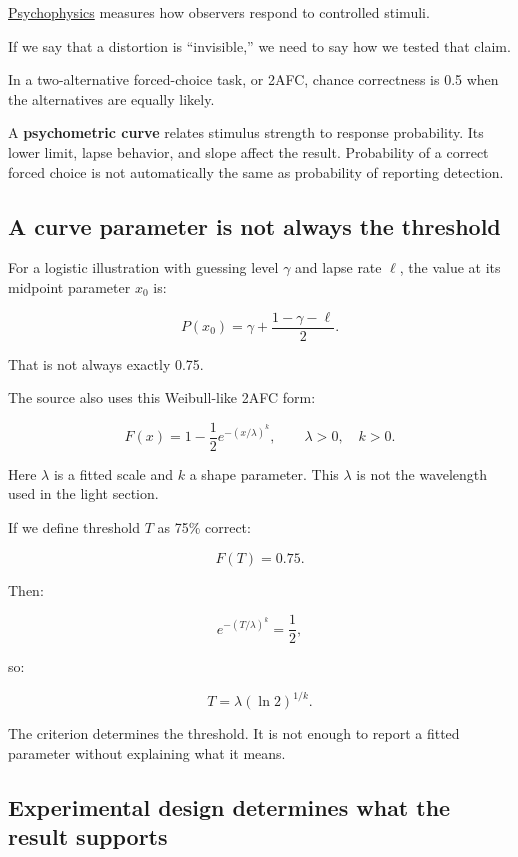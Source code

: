 \hyperref[appendix-1759f03e8ce7]{Psychophysics} measures how observers respond to controlled stimuli.

If we say that a distortion is ``invisible,'' we need to say how we tested that claim.

In a two-alternative forced-choice task, or 2AFC, chance correctness is 0.5 when the alternatives are equally likely.

A \textbf{psychometric curve} relates stimulus strength to response probability. Its lower limit, lapse behavior, and slope affect the result. Probability of a correct forced choice is not automatically the same as probability of reporting detection.

\subsection{A curve parameter is not always the threshold}\label{04-visual-computing-ii-ch043-a-curve-parameter-is-not-always-the-threshold}

For a logistic illustration with guessing level \(\gamma\) and lapse rate \(\ell\), the value at its midpoint parameter \(x_0\) is:

\[
P(x_0)=\gamma+\frac{1-\gamma-\ell}{2}.
\]

That is not always exactly 0.75.

The source also uses this Weibull-like 2AFC form:

\[
F(x)=1-\frac12e^{-(x/\lambda)^k},
\qquad \lambda>0,\quad k>0.
\]

Here \(\lambda\) is a fitted scale and \(k\) a shape parameter. This \(\lambda\) is not the wavelength used in the light section.

If we define threshold \(T\) as 75\% correct:

\[
F(T)=0.75.
\]

Then:

\[
e^{-(T/\lambda)^k}=\frac12,
\]

so:

\[
T=\lambda(\ln2)^{1/k}.
\]

The criterion determines the threshold. It is not enough to report a fitted parameter without explaining what it means.

\subsection{Experimental design determines what the result supports}\label{04-visual-computing-ii-ch043-experimental-design-determines-what-the-result-supports}


